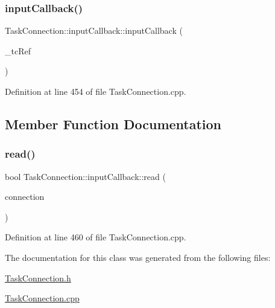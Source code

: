 \subsubsection{\texorpdfstring{input\+Callback()}{inputCallback()}}
{\footnotesize\ttfamily Task\+Connection\+::input\+Callback\+::input\+Callback (\begin{DoxyParamCaption}\item[{\hyperlink{classocra__recipes_1_1TaskConnection}{Task\+Connection} \&}]{\+\_\+tc\+Ref }\end{DoxyParamCaption})}



Definition at line 454 of file Task\+Connection.\+cpp.



\subsection{Member Function Documentation}
\hypertarget{classocra__recipes_1_1TaskConnection_1_1inputCallback_a6572ca3aa11c347ecd414ea760ae89bc}{}\label{classocra__recipes_1_1TaskConnection_1_1inputCallback_a6572ca3aa11c347ecd414ea760ae89bc} 
\subsubsection{\texorpdfstring{read()}{read()}}
{\footnotesize\ttfamily bool Task\+Connection\+::input\+Callback\+::read (\begin{DoxyParamCaption}\item[{yarp\+::os\+::\+Connection\+Reader \&}]{connection }\end{DoxyParamCaption})\hspace{0.3cm}{\ttfamily [virtual]}}



Definition at line 460 of file Task\+Connection.\+cpp.



The documentation for this class was generated from the following files\+:\begin{DoxyCompactItemize}
\item 
\hyperlink{TaskConnection_8h}{Task\+Connection.\+h}\item 
\hyperlink{TaskConnection_8cpp}{Task\+Connection.\+cpp}\end{DoxyCompactItemize}
